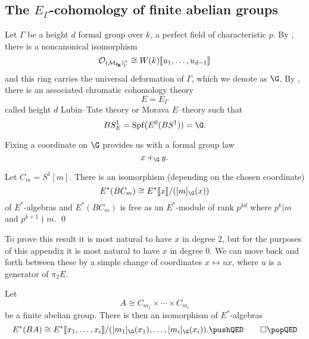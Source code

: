 
\subsection*{The $E_{\Gamma}$-cohomology of finite abelian groups}



Let $\Gamma$ be a height $d$ formal group over $k$, a perfect field of characteristic $p$. By , there is a noncanonical isomorphism 
\[
\mathcal{O}_{(\mathcal{M}_{\mathbf{fg}})^\wedge_\Gamma} \cong W(k)\llbracket{u_1, \ldots, u_{d-1}}\rrbracket
\] 
and this ring carries the universal deformation of $\Gamma$, which we denote as $\G$. By , there is an associated chromatic cohomology theory
\[
E = E_{\Gamma}
\]
called height $d$ Lubin--Tate theory or Morava $E$--theory such that
\[
BS^1_E = \Spf(E^0(BS^1)) = \G.
\]

Fixing a coordinate on $\G$ provides us with a formal group law
\[
x +_{\G} y.
\]

\begin{proposition} \label{app:cyclic}
Let $C_{m} = S^1[m]$. There is an isomorphism (depending on the chosen coordinate) 
\[
E^*(BC_{m}) \cong E^*\ps{x}/([m]_{\G}(x))
\]
of $E^*$-algebras and $E^*(BC_{m})$ is free as an $E^*$-module of rank $p^{kd}$ where $p^k|m$ and $p^{k+1} \nmid m$. \pushQED\qed \qedhere \popQED
\end{proposition}
To prove this result it is most natural to have $x$ in degree $2$, but for the purposes of this appendix it is most natural to have $x$ in degree $0$. We can move back and forth between these by a simple change of coordinates $x \leftrightarrow ux$, where $u$ is a generator of $\pi_2E$.

\begin{proposition} \label{app:ab}
Let 
\[
A \cong C_{m_1} \times \cdots \times C_{m_i}
\]
be a finite abelian group.  There is then an isomorphism of $E^*$-algebras
\[
E^*(BA) \cong E^*\ps{x_1, \ldots, x_{i}}/([m_1]_{\G}(x_1), \ldots, [m_i]_{\G}(x_i)). \pushQED\qed \qedhere \popQED
\]
\end{proposition}


